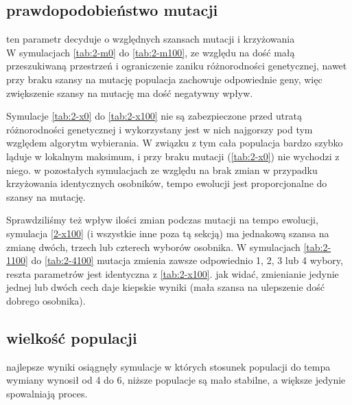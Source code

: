 \documentclass{article}
\newcommand{\inputgraph}[1]{\newpage \newpage} %
\begin{document}
\inputgraph{1-mit.transient.tex}
\inputgraph{1-mif.transient.tex}
\subsection{prawdopodobieństwo mutacji}
ten parametr decyduje o względnych szansach mutacji i krzyżowania
\\
W symulacjach \ref{tab:2-m0} do \ref{tab:2-m100}, ze względu na dość małą przeszukiwaną
przestrzeń i ograniczenie zaniku różnorodności genetycznej, nawet przy braku
szansy na mutację populacja zachowuje odpowiednie geny, więc zwiększenie szansy
na mutację ma dość negatywny wpływ.
\inputgraph{2-m0.transient.tex}
\inputgraph{2-m10.transient.tex}
\inputgraph{2-m25.transient.tex}
\inputgraph{2-m50.transient.tex}
\inputgraph{2-m75.transient.tex}
\inputgraph{2-m100.transient.tex}

Symulacje \ref{tab:2-x0} do \ref{tab:2-x100} nie są zabezpieczone przed utratą
różnorodności genetycznej i wykorzystany jest w nich najgorszy pod tym względem
algorytm wybierania. W związku z tym cała populacja bardzo szybko ląduje w
lokalnym maksimum, i przy braku mutacji (\ref{tab:2-x0}) nie wychodzi z niego. w
pozostałych symulacjach ze względu na brak zmian w przypadku krzyżowania
identycznych osobników, tempo ewolucji jest proporcjonalne do szansy na mutację.

\inputgraph{2-x0.transient.tex}
\inputgraph{2-x25.transient.tex}
\inputgraph{2-x50.transient.tex}
\inputgraph{2-x75.transient.tex}
\inputgraph{2-x100.transient.tex}

Sprawdziliśmy też wpływ ilości zmian podczas mutacji na tempo ewolucji, symulacja
\ref{2-x100} (i wszystkie inne poza tą sekcją) ma jednakową szansa na zmianę
dwóch, trzech lub czterech
wyborów osobnika. W symulacjach \ref{tab:2-1100} do \ref{tab:2-4100} mutacja
zmienia zawsze odpowiednio 1, 2, 3 lub 4 wybory, reszta parametrów jest
identyczna z \ref{tab:2-x100}. jak widać, zmienianie jedynie jednej lub dwóch
cech daje kiepskie wyniki (mała szansa na ulepszenie dość dobrego osobnika).
\\

\inputgraph{2-1100.transient.tex}
\inputgraph{2-2100.transient.tex}
\inputgraph{2-3100.transient.tex}
\inputgraph{2-4100.transient.tex}

\subsection{wielkość populacji}
najlepsze wyniki osiągnęły symulacje w których stosunek populacji do tempa wymiany wynosił od 4 do 6,
niższe populacje są mało stabilne, a większe jedynie spowalniają proces.
\\
\end{document}
